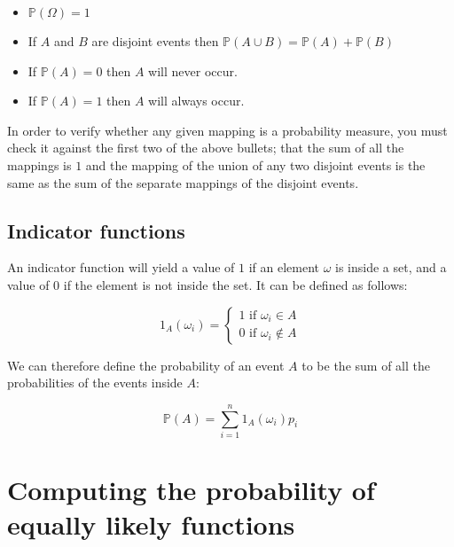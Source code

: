 \begin{itemize}
	\item $\mathbb{P}(\Omega) = 1$
	\item If $A$ and $B$ are disjoint events then $\mathbb{P}(A \cup B) = \mathbb{P}(A) + \mathbb{P}(B)$
	\item If $\mathbb{P}(A) = 0$ then $A$ will never occur.
	\item If $\mathbb{P}(A) = 1$ then $A$ will always occur.
\end{itemize}


In order to verify whether any given mapping is a probability measure, you must
check it against the first two of the above bullets; that the sum of all the
mappings is $1$ and the mapping of the union of any two disjoint events is the
same as the sum of the separate mappings of the disjoint events.

\subsection{Indicator functions}

An indicator function will yield a value of $1$ if an element $\omega$ is inside
a set, and a value of $0$ if the element is not inside the set. It can be
defined as follows:

\begin{dmath}
	1_A(\omega_i) = \begin{cases} 
						1\textrm{ if }\omega_i \in A\\
						0\textrm{ if }\omega_i \not\in A
					\end{cases}
\end{dmath}

We can therefore define the probability of an event $A$ to be the sum of all the
probabilities of the events inside $A$:

\begin{dmath}
	\mathbb{P}(A) = \sum\limits_{i=1}^n1_A(\omega_i)p_i
\end{dmath}


\section{Computing the probability of equally likely functions}

